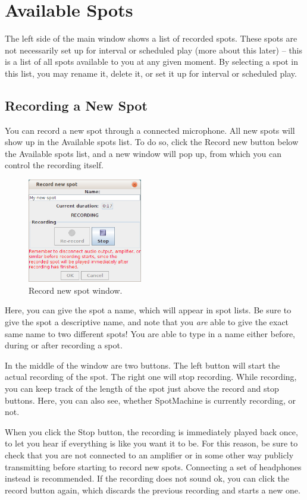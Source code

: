 \documentclass[a4paper,12pt]{report}
\begin{document}
\section{Available Spots}
The left side of the main window shows a list of recorded spots. These spots are not necessarily set up for interval or scheduled play (more about this later) -- this is a list of all spots available to you at any given moment. By selecting a spot in this list, you may rename it, delete it, or set it up for interval or scheduled play.

\subsection{Recording a New Spot}
You can record a new spot through a connected microphone. All new spots will show up in the Available spots list. To do so, click the Record new button below the Available spots list, and a new window will pop up, from which you can control the recording itself.

\begin{figure}[h]
\centering \includegraphics[width=50mm]{recorddialogue.png}
\caption{Record new spot window.}
\end{figure}

Here, you can give the spot a name, which will appear in spot lists. Be sure to give the spot a descriptive name, and note that you {\em are} able to give the exact same name to two different spots! You are able to type in a name either before, during or after recording a spot.

In the middle of the window are two buttons. The left button will start the actual recording of the spot. The right one will stop recording. While recording, you can keep track of the length of the spot just above the record and stop buttons. Here, you can also see, whether SpotMachine is currently recording, or not.

When you click the Stop button, the recording is immediately played back once, to let you hear if everything is like you want it to be. For this reason, be sure to check that you are not connected to an amplifier or in some other way publicly transmitting before starting to record new spots. Connecting a set of headphones instead is recommended. If the recording does not sound ok, you can click the record button again, which discards the previous recording and starts a new one.
\end{document}
